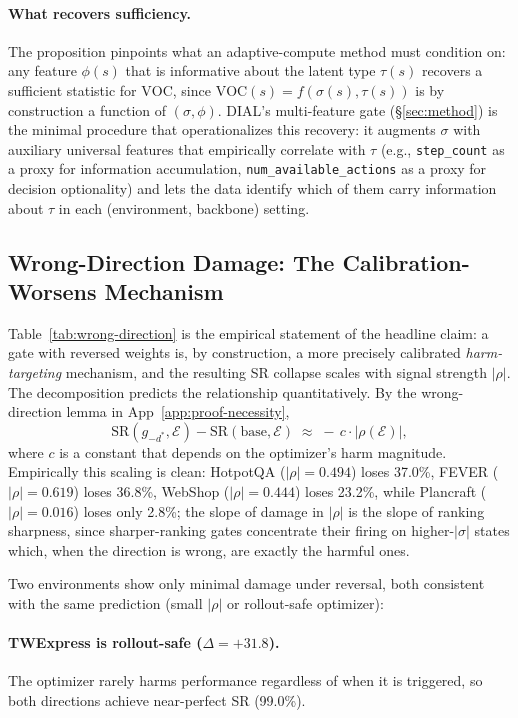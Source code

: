 \paragraph{What recovers sufficiency.}
The proposition pinpoints what an adaptive-compute method must
condition on: any feature $\phi(s)$ that is informative about
the latent type $\tau(s)$ recovers a sufficient statistic for
$\mathrm{VOC}$, since
$\mathrm{VOC}(s) = f(\sigma(s), \tau(s))$ is by construction a
function of $(\sigma, \phi)$. DIAL's multi-feature gate
(\S\ref{sec:method}) is the minimal procedure that operationalizes
this recovery: it augments $\sigma$ with auxiliary universal
features that empirically correlate with $\tau$ (e.g.,
\texttt{step\_count} as a proxy for information accumulation,
\texttt{num\_available\_actions} as a proxy for decision
optionality) and lets the data identify which of them carry
information about $\tau$ in each (environment, backbone) setting.

\subsection{Wrong-Direction Damage: The Calibration-Worsens
  Mechanism}
\label{app:wrong-direction}

Table~\ref{tab:wrong-direction} is the empirical statement of
the headline claim: a gate with reversed weights is, by
construction, a more precisely calibrated \emph{harm-targeting}
mechanism, and the resulting SR collapse scales with signal
strength $|\rho|$. The decomposition predicts the relationship
quantitatively. By the wrong-direction lemma in
App~\ref{app:proof-necessity},
\[
  \mathrm{SR}(g_{-d^*}, \mathcal{E}) -
  \mathrm{SR}(\mathrm{base}, \mathcal{E})
  \;\approx\; -\,c \cdot |\rho(\mathcal{E})|,
\]
where $c$ is a constant that depends on the optimizer's harm
magnitude. Empirically this scaling is clean: HotpotQA
($|\rho|{=}0.494$) loses 37.0\%, FEVER ($|\rho|{=}0.619$)
loses 36.8\%, WebShop ($|\rho|{=}0.444$) loses 23.2\%,
while Plancraft ($|\rho|{=}0.016$) loses only 2.8\%; the
slope of damage in $|\rho|$ is the slope of ranking
sharpness, since sharper-ranking gates concentrate their firing
on higher-$|\sigma|$ states which, when the direction is wrong,
are exactly the harmful ones.

Two environments show only minimal damage under reversal, both
consistent with the same prediction (small $|\rho|$ or
rollout-safe optimizer):

\paragraph{TWExpress is rollout-safe ($\Delta{=}{+}31.8$).}
The optimizer rarely harms performance regardless of when it is
triggered, so both directions achieve near-perfect SR (99.0\%).

